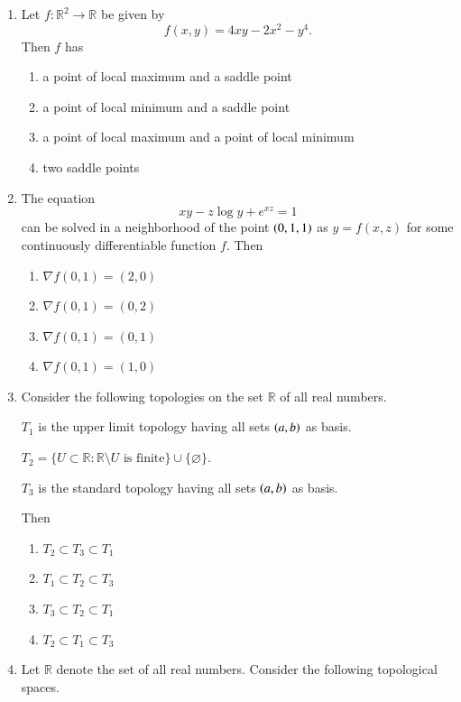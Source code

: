 \documentclass[journal,12pt,onecolumn]{IEEEtran}
\theoremstyle{remark}
\begin{document}
\begin{enumerate}[start=1, label=Q.\arabic*]
\hfill{}


\item Let $f: \mathbb{R}^{2}\to \mathbb{R}$ be given by 
\[
f(x,y)=4xy-2x^{2}-y^{4}.
\]  
Then $f$ has
\begin{enumerate}
\item a point of local maximum and a saddle point
\item a point of local minimum and a saddle point
\item a point of local maximum and a point of local minimum
\item two saddle points
\end{enumerate}

\hfill{}


\item The equation 
\[
xy - z\log y + e^{xz} = 1
\]
can be solved in a neighborhood of the point $\left(0,1,1\right)$ as $y=f(x,z)$ for some continuously differentiable function $f$. Then
\begin{enumerate}
\item $\nabla f(0,1)=(2,0)$
\item $\nabla f(0,1)=(0,2)$
\item $\nabla f(0,1)=(0,1)$
\item $\nabla f(0,1)=(1,0)$
\end{enumerate}

\hfill{}
\item Consider the following topologies on the set $\mathbb{R}$ of all real numbers.  

$T_{1}$ is the upper limit topology having all sets $\left(a,b\right)$ as basis.  

$T_{2}=\{U \subset \mathbb{R} : \mathbb{R}\setminus U \text{ is finite}\}\cup \{\varnothing\}$.  

$T_{3}$ is the standard topology having all sets $\left(a,b\right)$ as basis.  

Then
\begin{enumerate}
\item $T_{2}\subset T_{3}\subset T_{1}$
\item $T_{1}\subset T_{2}\subset T_{3}$
\item $T_{3}\subset T_{2}\subset T_{1}$
\item $T_{2}\subset T_{1}\subset T_{3}$
\end{enumerate}

\hfill{}


\item Let $\mathbb{R}$ denote the set of all real numbers. Consider the following topological spaces.  


\end{enumerate}
\end{document}
